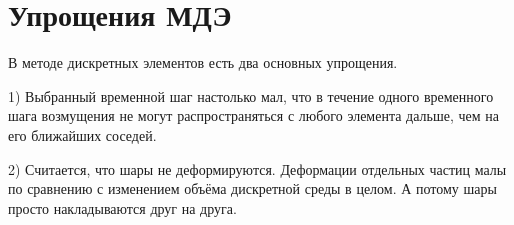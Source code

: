 \documentclass[a4paper]{article}
\begin{document}
\section{Упрощения МДЭ}

В методе дискретных элементов есть два основных упрощения.

1) Выбранный временной шаг настолько мал, что в течение одного временного шага возмущения не могут распространяться с любого элемента дальше, чем на его ближайших соседей. 

2) Считается, что шары не деформируются.
Деформации отдельных частиц малы по сравнению с изменением объёма дискретной среды в целом.
А потому шары просто накладываются друг на друга.
\end{document}
